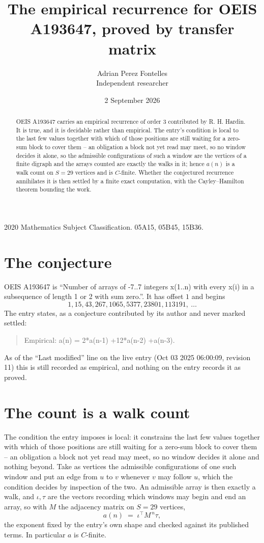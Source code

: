 \documentclass[11pt,a4paper]{article}
\title{The empirical recurrence for OEIS A193647, proved by transfer matrix}
\author{Adrian Perez Fontelles\\ \small Independent researcher}
\date{2 September 2026}
\theoremstyle{plain}
\theoremstyle{definition}
\begin{document}
\maketitle

\begin{abstract}
OEIS A193647 carries an empirical recurrence of order $3$ contributed by R. H. Hardin. It is
true, and it is decidable rather than empirical. The entry's condition is local to the last few values together with which of those positions are still waiting for a zero-sum block to cover them -- an obligation a block not yet read may meet, so no window decides it alone, so
the admissible configurations of such a window are the vertices of a finite digraph and the
arrays counted are exactly the walks in it; hence $a(n)$ is a walk count on $S=29$ vertices
and is $C$-finite. Whether the conjectured recurrence annihilates it is then settled by a
finite exact computation, with the Cayley--Hamilton theorem bounding the work.
\end{abstract}

\noindent\small 2020 Mathematics Subject Classification. 05A15, 05B45, 15B36.\normalsize

\section{The conjecture}

OEIS A193647 is ``Number of arrays of -7..7 integers x(1..n) with every x(i) in a subsequence of length 1 or 2 with sum zero.''. It has offset $1$ and begins
\[
1, 15, 43, 267, 1065, 5377, 23801, 113191,\ \dots
\]
The entry states, as a conjecture contributed by its author and never marked settled:
\begin{quote}
Empirical: a(n) = 2*a(n-1) +12*a(n-2) +a(n-3).
\end{quote}
As of the ``Last modified'' line on the live entry (Oct 03 2025 06:00:09, revision 11) this is still
recorded as empirical, and nothing on the entry records it as proved.

\section{The count is a walk count}

The condition the entry imposes is local: it constrains the last few values together with which of those positions are still waiting for a zero-sum block to cover them -- an obligation a block not yet read may meet, so no window decides it alone and nothing beyond. Take as vertices the admissible configurations of one such window and put an edge from $u$ to $v$ whenever $v$ may follow $u$, which the condition decides by inspection of the two.
An admissible array is then exactly a walk, and $\iota,\tau$ are the vectors recording which windows may begin and end an array, so with $M$ the adjacency matrix on $S=29$ vertices,
\[
a(n)\;=\;\iota^{\!\top}M^{\,n}\tau ,
\]
the exponent fixed by the entry's own shape and checked against its published terms. In
particular $a$ is $C$-finite.
\end{document}
